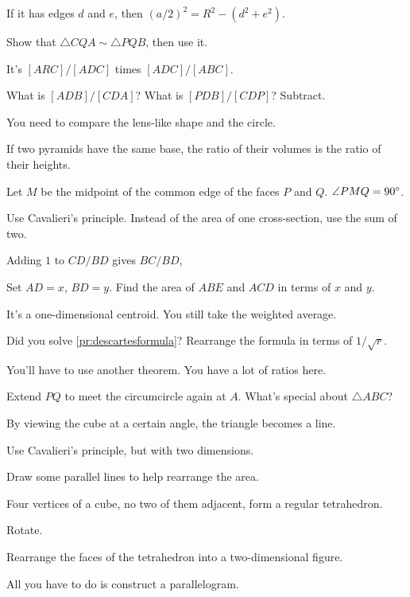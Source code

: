 \documentclass[11pt,paper=letter]{scrartcl}
\begin{document}
\begin{enumthin}[leftmargin=0pt]
\item \label{h:gbb4} If it has edges $d$ and $e$, then $(a/2)^2 = R^2 - (d^2 + e^2)$.
\item \label{h:vs32} Show that $\triangle CQA \sim \triangle PQB$, then use it.
\item \label{h:rt02} It's $[ARC]/[ADC]$ times $[ADC]/[ABC]$.
\item \label{h:cv02} What is $[ADB]/[CDA]$? What is $[PDB]/[CDP]$? Subtract.
\item \label{h:np22} You need to compare the lens-like shape and the circle.
\item \label{h:gbd3} If two pyramids have the same base, the ratio of their volumes is the ratio of their heights.
\item \label{h:eq32} Let $M$ be the midpoint of the common edge of the faces $P$ and $Q$. $\angle PMQ = 90^\circ$.
\item \label{h:np11} Use Cavalieri's principle. Instead of the area of one cross-section, use the sum of two.
\item \label{h:rt05} Adding $1$ to $CD/BD$ gives $BC/BD$,
\item \label{h:pt52} Set $AD = x$, $BD = y$. Find the area of $ABE$ and $ACD$ in terms of $x$ and $y$.
\item \label{h:pc21} It's a one-dimensional centroid. You still take the weighted average.
\item \label{h:dt31} Did you solve \autoref{pr:descartesformula}? Rearrange the formula in terms of $1/\sqrt{r}$.
\item \label{h:rt03} You'll have to use another theorem. You have a lot of ratios here.
\item \label{h:vs31} Extend $PQ$ to meet the circumcircle again at $A$. What's special about $\triangle ABC$?
\item \label{h:gbc2} By viewing the cube at a certain angle, the triangle becomes a line.
\item \label{h:np21} Use Cavalieri's principle, but with two dimensions.
\item \label{h:os40} Draw some parallel lines to help rearrange the area.
\item \label{h:eq43} Four vertices of a cube, no two of them adjacent, form a regular tetrahedron.
\item \label{h:pt41} Rotate.
\item \label{h:gbf2} Rearrange the faces of the tetrahedron into a two-dimensional figure.
\item \label{h:pl31} All you have to do is construct a parallelogram.

\end{enumthin}
\end{document}
